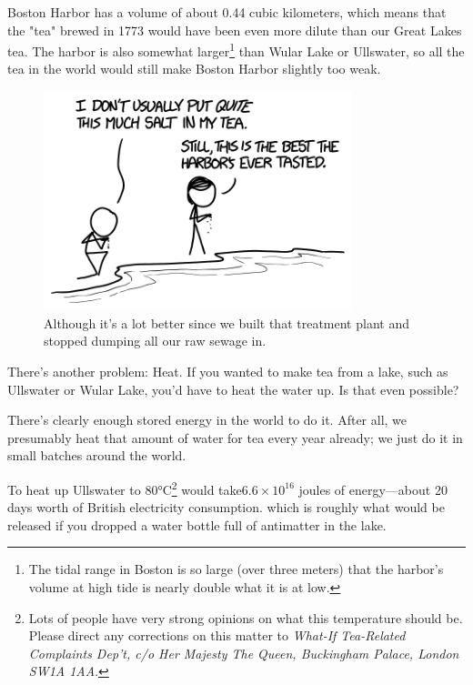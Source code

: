 {{Boston Harbor has a volume of about 0.44 cubic kilometers, which means that the "tea" brewed in 1773 would have been even more dilute than our Great Lakes tea. The harbor is also somewhat larger{\footnote{The tidal range in Boston is so large (over three meters) that the harbor's volume at high tide is nearly double what it is at low.} } than Wular Lake or Ullswater, so all the tea in the world would still make Boston Harbor slightly too weak.}

\begin{figure}[!htbp]
\centering
\includegraphics[scale=0.5, max width=0.8\textwidth]{imgs/a/79/tea_harbor.png}
\caption{Although it's a lot better since we built that treatment plant and stopped dumping all our raw sewage in.}
\end{figure}

{There's another problem: Heat. If you wanted to make tea from a lake, such as Ullswater or Wular Lake, you'd have to heat the water up. Is that even possible?}

{There's clearly enough stored energy in the world to do it. After all, we presumably heat that amount of water for tea every year already; we just do it in small batches around the world.}

{To heat up Ullswater to 80°C{\footnote{Lots of people have very strong opinions on what this temperature should be. Please direct any corrections on this matter to \emph{What-If Tea-Related Complaints Dep't, c/o Her Majesty The Queen, Buckingham Palace, London SW1A 1AA}.} } would take\(6.6\times 10^{16}\) joules of energy—about 20 days worth of British electricity consumption. which is roughly what would be released if you dropped a water bottle full of antimatter in the lake.}

}
